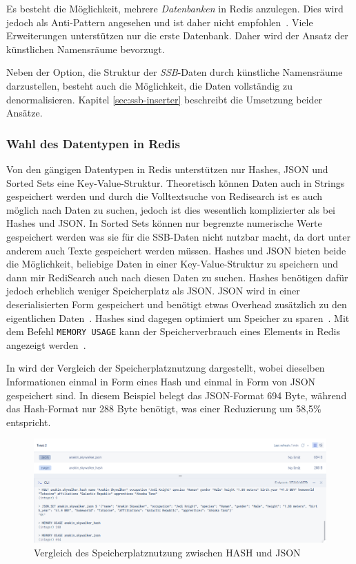 Es besteht die Möglichkeit, mehrere \emph{Datenbanken} in Redis anzulegen.
Dies wird jedoch als Anti-Pattern angesehen und ist daher nicht empfohlen~\cite{prickett_answer_2022}. Viele Erweiterungen unterstützen nur die erste Datenbank. Daher wird der Ansatz der künstlichen Namensräume bevorzugt. 

Neben der Option, die Struktur der \emph{SSB}-Daten durch künstliche Namensräume darzustellen, besteht auch die Möglichkeit, die Daten vollständig zu denormalisieren. Kapitel \ref{sec:ssb-inserter} beschreibt die Umsetzung beider Ansätze.


\subsubsection{Wahl des Datentypen in Redis}
Von den gängigen Datentypen in Redis unterstützen nur Hashes, JSON und Sorted Sets eine Key-Value-Struktur. Theoretisch können Daten auch in Strings gespeichert werden und durch die Volltextsuche von Redisearch ist es auch möglich nach Daten zu suchen, jedoch ist dies wesentlich komplizierter als bei Hashes und JSON.
In Sorted Sets können nur begrenzte numerische Werte gespeichert werden was sie für die SSB-Daten nicht nutzbar macht, da dort unter anderem auch Texte gespeichert werden müssen.
Hashes und JSON bieten beide die Möglichkeit, beliebige Daten in einer Key-Value-Struktur zu speichern und dann mir RediSearch auch nach diesen Daten zu suchen.
Hashes benötigen dafür jedoch erheblich weniger Speicherplatz als JSON.
JSON wird in einer deserialisierten Form gespeichert und benötigt etwas Overhead zusätzlich zu den eigentlichen Daten~\cite{redis_ltd_json-ram-usage_nodate}.
Hashes sind dagegen optimiert um Speicher zu sparen~\cite{redis_ltd_memory-optimization_nodate}.
Mit dem Befehl \texttt{MEMORY USAGE} kann der Speicherverbrauch eines Elements in Redis angezeigt werden~\cite{redis_ltd_memory-usage-command-redis_nodate}.

In  wird der Vergleich der Speicherplatznutzung dargestellt, wobei dieselben Informationen einmal in Form eines Hash und einmal in Form von JSON gespeichert sind. In diesem Beispiel belegt das JSON-Format 694 Byte, während das Hash-Format nur 288 Byte benötigt, was einer Reduzierung um 58,5\% entspricht.
\begin{figure}[!h]  %
    \centering
    \includegraphics[width=1\textwidth]{pictures/redis/redis_hash_vs_json_memory.png}
    \caption{Vergleich des Speicherplatznutzung zwischen HASH und JSON}
    \label{pic:redis-hash-vs-json-memory}
\end{figure}

